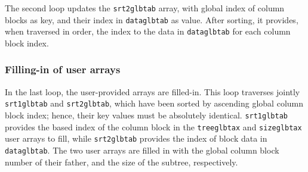 The second loop updates the \texttt{srt2glbtab} array, with global
index of column blocks as key, and their index in \texttt{dataglbtab}
as value. After sorting, it provides, when traversed in order, the
index to the data in \texttt{dataglbtab} for each column block index.

\subsubsection{Filling-in of user arrays}

In the last loop, the user-provided arrays are filled-in. This loop
traverses jointly \texttt{srt1glbtab} and \texttt{srt2glbtab}, which
have been sorted by ascending global column block index; hence, their
key values must be absolutely identical. \texttt{srt1glbtab} provides
the based index of the column block in the \texttt{treeglbtax} and
\texttt{sizeglbtax} user arrays to fill, while \texttt{srt2glbtab}
provides the index of block data in \texttt{dataglbtab}. The two user
arrays are filled in with the global column block number of their
father, and the size of the subtree, respectively.
